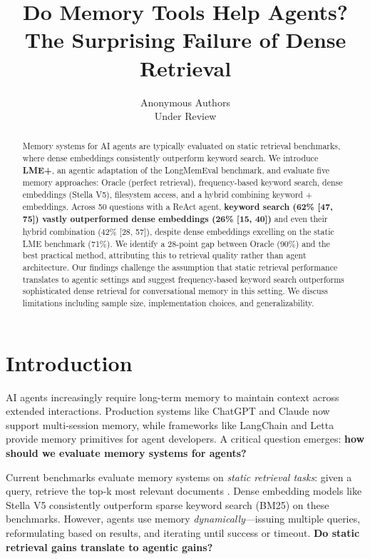 \documentclass{article}
\title{Do Memory Tools Help Agents? \\The Surprising Failure of Dense Retrieval}
\author{
  Anonymous Authors \\
  Under Review
}
\date{}
\begin{document}
\maketitle

\begin{abstract}
Memory systems for AI agents are typically evaluated on static retrieval benchmarks, where dense embeddings consistently outperform keyword search. We introduce \textbf{LME+}, an agentic adaptation of the LongMemEval benchmark, and evaluate five memory approaches: Oracle (perfect retrieval), frequency-based keyword search, dense embeddings (Stella V5), filesystem access, and a hybrid combining keyword + embeddings. Across 50 questions with a ReAct agent, \textbf{keyword search (62\% [47, 75]) vastly outperformed dense embeddings (26\% [15, 40])} and even their hybrid combination (42\% [28, 57]), despite dense embeddings excelling on the static LME benchmark (71\%). We identify a 28-point gap between Oracle (90\%) and the best practical method, attributing this to retrieval quality rather than agent architecture. Our findings challenge the assumption that static retrieval performance translates to agentic settings and suggest frequency-based keyword search outperforms sophisticated dense retrieval for conversational memory in this setting. We discuss limitations including sample size, implementation choices, and generalizability.
\end{abstract}

\section{Introduction}
\label{sec:introduction}

AI agents increasingly require long-term memory to maintain context across extended interactions. Production systems like ChatGPT \cite{openai2023chatgpt} and Claude now support multi-session memory, while frameworks like LangChain \cite{langchain} and Letta \cite{letta2025} provide memory primitives for agent developers. A critical question emerges: \textbf{how should we evaluate memory systems for agents?}

Current benchmarks evaluate memory systems on \emph{static retrieval tasks}: given a query, retrieve the top-k most relevant documents \cite{wu2024longmemeval, thakur2021beir}. Dense embedding models like Stella V5 \cite{stella2024} consistently outperform sparse keyword search (BM25) on these benchmarks. However, agents use memory \emph{dynamically}---issuing multiple queries, reformulating based on results, and iterating until success or timeout. \textbf{Do static retrieval gains translate to agentic gains?}
\end{document}
